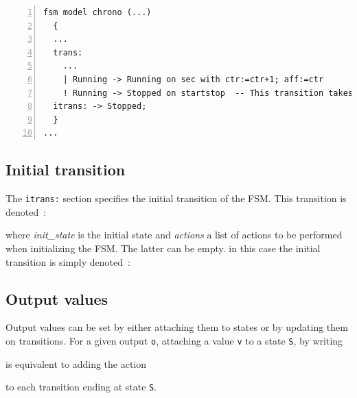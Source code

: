 \begin{lstlisting}[language=Rfsm,frame=single,numbers=left,caption=A rewriting of the model defined
  in Listing~\ref{lst:rfsm-prio-pb}, label={lst:rfsm-prio-solved},float]
fsm model chrono (...)
  {
  ...
  trans:
    ...
    | Running -> Running on sec with ctr:=ctr+1; aff:=ctr
    ! Running -> Stopped on startstop  -- This transition takes priority on the others
  itrans: -> Stopped;
  }
...
\end{lstlisting}

\subsection{Initial transition}
\label{sec:initial-transition}

The \verb|itrans:| section specifies the initial transition of the FSM. This transition is denoted~:

\begin{center}
\end{center}

where \emph{init\_state} is the initial state and \emph{actions} a list of actions to be performed
when initializing the FSM. The latter can be empty. in this case the initial transition is simply
denoted~:

\begin{center}
\end{center}

\subsection{Output values}

Output values can be set by either attaching them to states or by updating them on
transitions. For a given output \texttt{o}, attaching a value \texttt{v} to a state \texttt{S}, by writing

\begin{center}
\end{center}

is equivalent to adding the action

\begin{center}
\end{center}

to each transition ending at state \texttt{S}.

